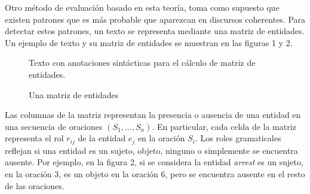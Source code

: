 \documentclass[12pt]{diicc}
\begin{document}
Otro método de evaluación basado en esta teoría, toma como supuesto que existen patrones que es más probable que aparezcan en discursos coherentes. Para detectar estos patrones, un texto se representa mediante una matriz de entidades. Un ejemplo de texto y su matriz de entidades se muestran en las figuras 1 y 2.
	
\begin{figure}[!htbp]
  \begin{center}
    \leavevmode
  \end{center}
  \caption{Texto con anotaciones sintácticas para el cálculo de matriz de entidades.}
  \label{figura1}
\end{figure}

\begin{figure}[!htbp]
  \begin{center}
    \leavevmode
  \end{center}
  \caption{Una matriz de entidades}
  \label{figura2}
\end{figure}

Las columnas de la matriz representan la presencia o ausencia de una entidad en una secuencia de oraciones $(S_1,...,S_n)$. En particular, cada celda de la matriz representa el rol $r_{ij}$ de la entidad $e_j$ en la oración $S_i$. Los roles gramaticales reflejan si una entidad es un sujeto, objeto, ninguno o simplemente se encuentra ausente. Por ejemplo, en la figura 2, si se considera la entidad \textit{arrest} es un sujeto, en la oración 3, es un objeto en la oración 6, pero se encuentra ausente en el resto de las oraciones. 
\end{document}
